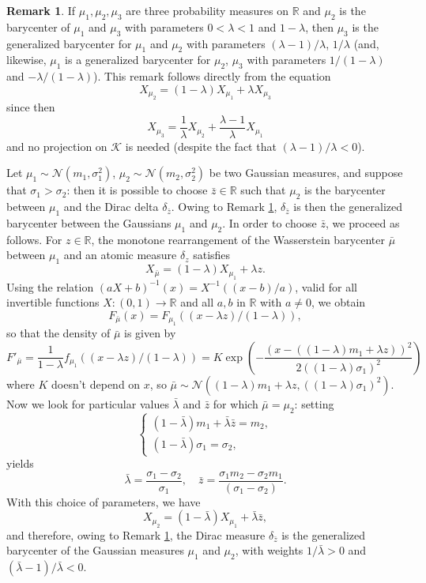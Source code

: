 \documentclass[12pt,a4paper]{article}
\newcommand{\R}{\mathbb{R}}
\newcommand{\K}{\mathcal{K}}
\theoremstyle{plain}
\theoremstyle{definition}
\newtheorem{remark}[theorem]{Remark}
\begin{document}
\begin{remark}
\label{rem:invert}
If $\mu_1, \mu_2, \mu_3$ are three probability measures on $\R$ and $\mu_2$ is the barycenter of $\mu_1$ and $\mu_3$ with parameters $0<\lambda<1$ and $1- \lambda$, then $\mu_3$ is the generalized barycenter for $\mu_1$ and $\mu_2$ with parameters $(\lambda-1)/\lambda$, $1/\lambda$ (and, likewise, $\mu_1$ is a generalized barycenter for $\mu_2$, $\mu_3$ with parameters $1/(1-\lambda)$ and $-\lambda / (1-\lambda)$). This remark follows directly from the equation
\[
    X_{\mu_2} = (1 - \lambda) X_{\mu_1} + \lambda X_{\mu_3}
\]
since then 
\[
    X_{\mu_3} = \frac{1}{\lambda} X_{\mu_2} + \frac{\lambda - 1}{\lambda}X_{\mu_1} 
\]
and no projection on $\K$ is needed (despite the fact that $(\lambda-1)/\lambda<0$).
\end{remark}
Let $\mu_1 \sim \mathcal{N}(m_1,\sigma^2_1)$, $\mu_2 \sim \mathcal{N}(m_2, \sigma_2^2)$ be two Gaussian measures, and suppose that $\sigma_1>\sigma_2$: then it is possible to choose $\bar z \in \R$ such that $\mu_2$ is the barycenter between $\mu_1$ and the Dirac delta $\delta_{\bar{z}}$. Owing to Remark \ref{rem:invert}, $\delta_{\bar{z}}$ is then the generalized barycenter between the Gaussians $\mu_1$ and $\mu_2$. In order to choose $\bar z$, we proceed as follows. For $z\in \R$, the monotone rearrangement of the Wasserstein barycenter $\bar{\mu}$ between $\mu_1$ and an atomic measure $\delta_z$ satisfies
\[
    X_{\bar{\mu}} = (1-\lambda)X_{\mu_1} + \lambda z.
\]
Using the relation $(a X + b)^{-1}(x) = X^{-1}((x-b)/a)$, valid for all invertible functions $X:(0,1) \to \mathbb{R}$ and all $a,b$ in $\R$ with $a \neq 0$, we obtain
\[
    F_{\bar{\mu}} (x) = F_{\mu_1} ((x - \lambda z)/(1-\lambda)),
\]
so that the density of $\bar \mu$ is given by
\[
    F'_{\bar{\mu}} = \frac{1}{1-\lambda}f_{\mu_1}((x - \lambda z)/(1-\lambda)) = K \exp \left( - \frac{(x - ((1-\lambda) m_1 + \lambda z))^2}{2((1-\lambda)\sigma_1)^2}\right)
\]
where $K$ doesn't depend on $x$, so $\bar{\mu} \sim \mathcal{N}((1-\lambda) m_1 + \lambda z, ((1-\lambda)\sigma_1 )^2) $. Now we look for particular values $\bar{\lambda}$ and $\bar{z}$ for which $\bar{\mu} = \mu_2$: setting
\[
    \begin{cases}
        (1-\bar{\lambda}) m_1 + \bar{\lambda} \bar{z} = m_2, \\
        (1-\bar{\lambda})\sigma_1 = \sigma_2,
    \end{cases}
\]
yields 
\[	
	\bar{\lambda} = \frac{\sigma_1 - \sigma_2}{\sigma_1}, \quad \bar{z} = \frac{\sigma_1 m_2 - \sigma_2 m_1}{(\sigma_1-\sigma_2)}.
\]
With this choice of parameters, we have
\[
    X_{\mu_2} = (1-\bar\lambda)X_{\mu_1} + \bar\lambda \bar{z},
\]
and therefore, owing to Remark \ref{rem:invert}, the Dirac measure $\delta_{\bar z}$ is the generalized barycenter of the Gaussian measures $\mu_1$ and $\mu_2$, with weights $1 /\bar{\lambda}>0$ and $(\bar{\lambda}-1)/\bar\lambda<0$.
\end{document}
